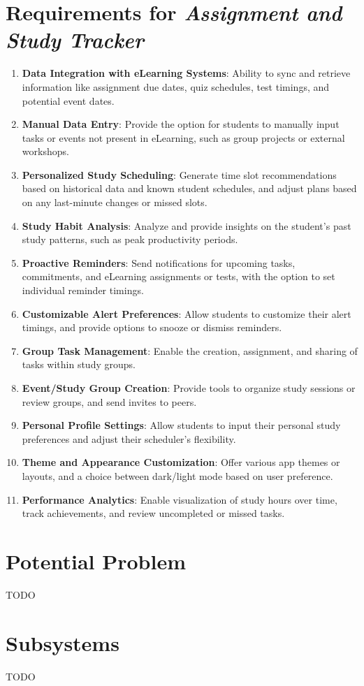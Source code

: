 \documentclass[12pt]{article}
\newcommand\projectname{\textit{Assignment and Study Tracker\ }}
\begin{document}
\section{Requirements for \projectname}
    \begin{enumerate}
        \item \textbf{Data Integration with eLearning Systems}: Ability to sync and retrieve information like assignment due dates, quiz schedules, test timings, and potential event dates.
        \item \textbf{Manual Data Entry}: Provide the option for students to manually input tasks or events not present in eLearning, such as group projects or external workshops.
        \item \textbf{Personalized Study Scheduling}: Generate time slot recommendations based on historical data and known student schedules, and adjust plans based on any last-minute changes or missed slots.
        \item \textbf{Study Habit Analysis}: Analyze and provide insights on the student's past study patterns, such as peak productivity periods.
        \item \textbf{Proactive Reminders}: Send notifications for upcoming tasks, commitments, and eLearning assignments or tests, with the option to set individual reminder timings.
        \item \textbf{Customizable Alert Preferences}: Allow students to customize their alert timings, and provide options to snooze or dismiss reminders.
        \item \textbf{Group Task Management}: Enable the creation, assignment, and sharing of tasks within study groups.
        \item \textbf{Event/Study Group Creation}: Provide tools to organize study sessions or review groups, and send invites to peers.
        \item \textbf{Personal Profile Settings}: Allow students to input their personal study preferences and adjust their scheduler's flexibility.
        \item \textbf{Theme and Appearance Customization}: Offer various app themes or layouts, and a choice between dark/light mode based on user preference.
        \item \textbf{Performance Analytics}: Enable visualization of study hours over time, track achievements, and review uncompleted or missed tasks.
    \end{enumerate}


\section{Potential Problem}
TODO

\section{Subsystems}
TODO
\end{document}
